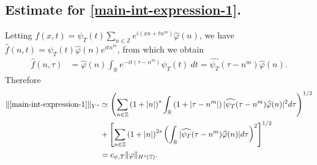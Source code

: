 \documentclass[12pt,reqno]{amsart}
\numberwithin{equation}{section}  %
\numberwithin{figure}{section}
\newcommand{\rr}{\mathbb{R}}
\newcommand{\zz}{\mathbb{Z}}
\newcommand{\ci}{\mathbb{T}}
\newcommand{\wh}{\widehat}
\newcommand{\vp}{\varphi}
\theoremstyle{plain}
\theoremstyle{definition}
\theoremstyle{remark}
\begin{document}
%
%
%
%
%
%
%
%
\subsection{Estimate for \eqref{main-int-expression-1}.}
%
%
Letting $f(x,t) = \psi_{T}(t) \sum_{n \in \zz} e^{i(xn + tn^{m})} 
\wh{\vp}(n)$, we have $\wh{f}(n,t) = \psi_{T}(t) \wh{\vp}(n) e^{itn^{m}}$,
from which we obtain
%
%
\begin{equation}
	\label{fourier-trans-calc}
	\begin{split}
		\wh{f}(n, \tau)
		& = \wh{\vp}(n) \int_\rr e^{-it( \tau - n^{m})} 
		\psi_{T}(t) \ d t
    = \wh{\psi_{T}}(\tau - n^{m}) \wh{\vp}(n).
	\end{split}
\end{equation}
%
%
%
%
%
%
Therefore
%
\begin{equation}
	\begin{split}
	\label{main-int1-est}
		\|\eqref{main-int-expression-1}\|_{Y^s}
		& \simeq \left (  \sum_{n\in \zz} \left (1 + |n| \right )^s \int_\rr \left( 1 + | \tau - n^{m} 
		| \right )
    | \wh{\psi_{T}}(\tau - n^{m}) \wh{\vp}(n) |^2 d \tau \right)^{1/2} 
		\\
		& + \left[ \sum_{n \in \zz }\left( 1 + | n | \right)^{2s} \left( \int_{\rr} |
    \wh{\psi_{T}}(\tau - n^{m})\wh{\vp}(n) | d \tau
		\right)^{2} \right]^{1/2}
		\\
    & = c_{\psi, T}
		\|\vp\|_{H^s(\ci)}.
	\end{split}
\end{equation}
%
%
%
%
\end{document}
